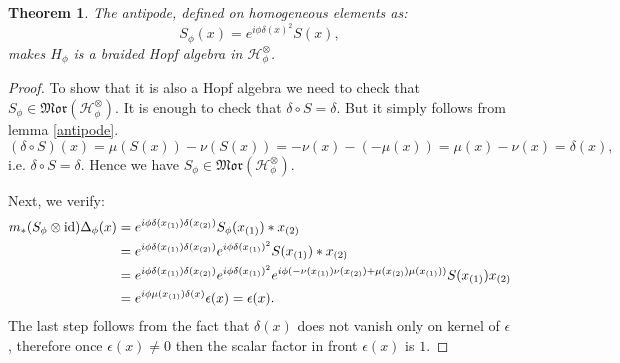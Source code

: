 \documentclass[12pt]{amsart}
\newtheorem{thm}{Theorem}[section]
\theoremstyle{definition}
\numberwithin{equation}{section}
\newcommand{\ox}{\otimes}           %
\begin{document}
\begin{thm}
\label{antithm}
The antipode, defined on homogeneous elements as:
$$S_{\phi}(x)=e^{i\phi\delta(x)^2}S(x),$$
makes $H_\phi$ is a braided Hopf algebra in $\mathcal{H}_{\phi}^{\otimes}$. 
\end{thm}

\begin{proof}
To show that it is also a Hopf algebra we need to check that $S_\phi\in \mathfrak{Mor}\left(\mathcal{H}_{\phi}^{\ox}\right)$. It is enough to check that $\delta\circ S=\delta$. But it simply follows from lemma \ref{antipode}.
\begin{equation}
(\delta \circ S)(x)=\mu(S(x))-\nu(S(x))=-\nu(x)-(-\mu(x))=\mu(x)-\nu(x)=\delta(x),
\end{equation}
i.e. $\delta\circ S=\delta$. Hence we have $S_\phi\in \mathfrak{Mor}\left(\mathcal{H}_{\phi}^{\ox}\right)$.

Next, we verify:
$$  
\begin{aligned}
m_\ast (S_\phi \otimes \hbox{id}) \Delta_\phi(x) 
&=  e^{ i \phi \delta(x_{(1)})  \delta(x_{(2)})}   S_\phi(x_{(1)}) \ast x_{(2)} \\
&=  e^{ i \phi \delta(x_{(1)})  \delta(x_{(2)})} e^{i\phi \delta(x_{(1)})^2 }  S(x_{(1)}) \ast x_{(2)} \\
&=  e^{ i \phi \delta(x_{(1)})  \delta(x_{(2)})} e^{i\phi \delta(x_{(1)})^2}  
    e^{ i \phi (-\nu(x_{(1)})  \nu(x_{(2)}) + \mu(x_{(2)}) \mu(x_{(1)}) )} S(x_{(1)}) x_{(2)} \\
&=  e^{ i \phi \mu(x_{(1)})  \delta(x) } \epsilon(x) = \epsilon(x).
\end{aligned}
$$
The last step follows from the fact that $\delta(x)$ does not vanish only on kernel of $\epsilon$, 
therefore once $\epsilon(x) \not= 0$ then the scalar factor in front $\epsilon(x)$ is $1$.
\end{proof}
\end{document}
